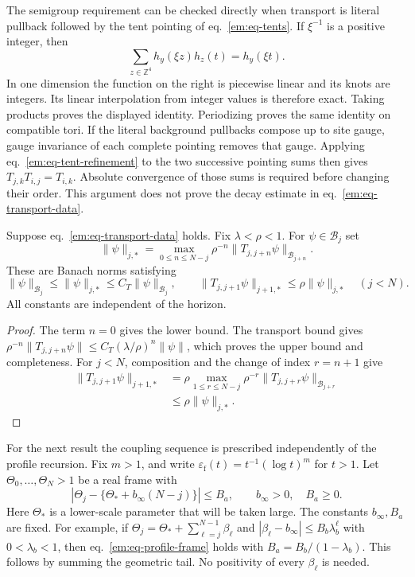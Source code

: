 \documentclass[11pt,letterpaper,reqno]{amsart}
\makeatletter
\numberwithin{equation}{section}
\renewcommand{\eqref}[1]{\textup{eq.~\ref{#1}}}
\theoremstyle{definition}
\newcommand{\ms@minorstart}{%
  \pushQED{\qed}\renewcommand{\qedsymbol}{$\blacksquare$}}
\newenvironment{lemma}[1][]{\ms@minorstart\ms@lemma[#1]}
  {\popQED\endms@lemma}
\theoremstyle{remark}
\makeatother
\begin{document}
The semigroup requirement can be checked directly when transport is
literal pullback followed by the tent pointing of \eqref{em:eq-tents}.
If $\xi^{-1}$ is a positive integer, then
\begin{equation}\label{em:eq-tent-refinement}
 \sum_{z\in\mathbb Z^4}h_y(\xi z)h_z(t)=h_y(\xi t).
\end{equation}
In one dimension the function on the right is piecewise linear and
its knots are integers. Its linear interpolation from integer values
is therefore exact. Taking products proves the displayed identity.
Periodizing proves the same identity on compatible tori. If the
literal background pullbacks compose up to site gauge, gauge
invariance of each complete pointing removes that gauge. Applying
\eqref{em:eq-tent-refinement} to the two successive pointing sums
then gives $T_{j,k}T_{i,j}=T_{i,k}$. Absolute convergence of those
sums is required before changing their order. This argument does
not prove the decay estimate in \eqref{em:eq-transport-data}.

\begin{lemma}[A norm adapted to transport]\label{em:lem-adapted-norm}
Suppose \eqref{em:eq-transport-data} holds. Fix $\lambda<\rho<1$.
For $\psi\in\mathcal B_j$ set
\begin{equation}\label{em:eq-adapted-norm}
 \|\psi\|_{j,*}=\max_{0\le n\le N-j}
       \rho^{-n}\|T_{j,j+n}\psi\|_{\mathcal B_{j+n}}.
\end{equation}
These are Banach norms satisfying
\[
 \|\psi\|_{\mathcal B_j}\le\|\psi\|_{j,*}
 \le C_T\|\psi\|_{\mathcal B_j},\qquad
 \|T_{j,j+1}\psi\|_{j+1,*}\le\rho\|\psi\|_{j,*}
 \quad(j<N).
\]
All constants are independent of the horizon.
\end{lemma}
\begin{proof}
The term $n=0$ gives the lower bound. The transport bound gives
$\rho^{-n}\|T_{j,j+n}\psi\|\le C_T(\lambda/\rho)^n\|\psi\|$,
which proves the upper bound and completeness. For $j<N$, composition
and the change of index $r=n+1$ give
\[
 \begin{split}
 \|T_{j,j+1}\psi\|_{j+1,*}
 &=\rho\max_{1\le r\le N-j}
             \rho^{-r}\|T_{j,j+r}\psi\|_{\mathcal B_{j+r}}\\
 &\le\rho\|\psi\|_{j,*}.
 \end{split}
\]
\end{proof}

For the next result the coupling sequence is prescribed independently
of the profile recursion. Fix $m>1$, and write
$\varepsilon_{\mathrm f}(t)=t^{-1}(\log t)^m$ for $t>1$.
Let $\Theta_0,\ldots,\Theta_N>1$ be a real frame with
\begin{equation}\label{em:eq-profile-frame}
 |\Theta_j-\{\Theta_*+b_\infty(N-j)\}|\le B_a,
 \qquad b_\infty>0,\quad B_a\ge0.
\end{equation}
Here $\Theta_*$ is a lower-scale parameter that will be taken large.
The constants $b_\infty,B_a$ are fixed. For example, if
$\Theta_j=\Theta_*+\sum_{\ell=j}^{N-1}\beta_\ell$ and
$|\beta_\ell-b_\infty|\le B_b\lambda_b^\ell$ with
$0<\lambda_b<1$, then \eqref{em:eq-profile-frame} holds with
$B_a=B_b/(1-\lambda_b)$. This follows by summing the geometric tail.
No positivity of every $\beta_\ell$ is needed.
\end{document}
